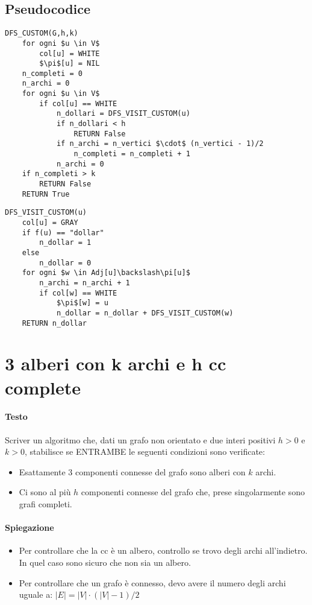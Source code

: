 \documentclass[12pt, a4paper, openany]{book}
\begin{document}
\subsection*{Pseudocodice}
\begin{lstlisting}[mathescape=true]
DFS_CUSTOM(G,h,k)
    for ogni $u \in V$
        col[u] = WHITE
        $\pi$[u] = NIL
    n_completi = 0
    n_archi = 0
    for ogni $u \in V$
        if col[u] == WHITE
            n_dollari = DFS_VISIT_CUSTOM(u)
            if n_dollari < h
                RETURN False
            if n_archi = n_vertici $\cdot$ (n_vertici - 1)/2
                n_completi = n_completi + 1
            n_archi = 0
    if n_completi > k
        RETURN False
    RETURN True
\end{lstlisting}

\begin{lstlisting}[mathescape=true]
DFS_VISIT_CUSTOM(u)
    col[u] = GRAY
    if f(u) == "dollar"
        n_dollar = 1
    else
        n_dollar = 0
    for ogni $w \in Adj[u]\backslash\pi[u]$
        n_archi = n_archi + 1
        if col[w] == WHITE
            $\pi$[w] = u
            n_dollar = n_dollar + DFS_VISIT_CUSTOM(w)
    RETURN n_dollar
\end{lstlisting}

\section{3 alberi con k archi e h cc complete}
\paragraph*{Testo}Scriver un algoritmo che, dati un grafo non orientato e due interi positivi $h>0$ e $k>0$,
stabilisce se ENTRAMBE le seguenti condizioni sono verificate:
\begin{itemize}
	\item Esattamente 3 componenti connesse del grafo sono alberi con $k$ archi.
	\item Ci sono al più $h$ componenti connesse del grafo che, prese singolarmente sono grafi completi.
\end{itemize}

\paragraph*{Spiegazione}
\begin{itemize}
	\item Per controllare che la cc è un albero, controllo se trovo degli archi all'indietro. In quel caso sono sicuro che non sia un albero.
	\item Per controllare che un grafo è connesso, devo avere il numero degli archi uguale a: $|E| = |V|\cdot (|V|-1)/2$
\end{itemize}
\end{document}
